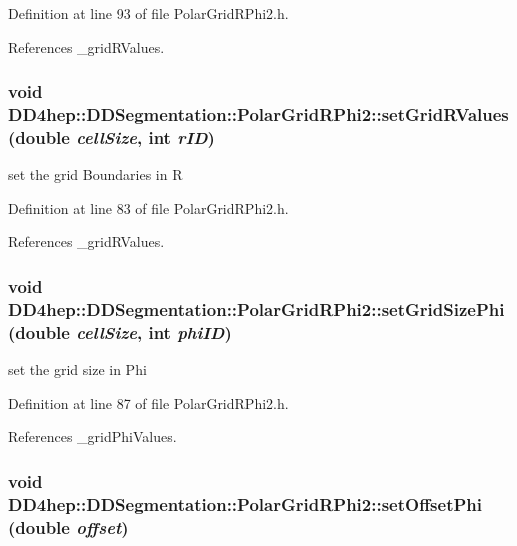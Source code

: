 Definition at line 93 of file PolarGridRPhi2.h.

References \_\-gridRValues.\hypertarget{class_d_d4hep_1_1_d_d_segmentation_1_1_polar_grid_r_phi2_a2194e846c26953f06cc74481d8aadeb4}{
\subsubsection[{setGridRValues}]{\setlength{\rightskip}{0pt plus 5cm}void DD4hep::DDSegmentation::PolarGridRPhi2::setGridRValues (double {\em cellSize}, \/  int {\em rID})}}
\label{class_d_d4hep_1_1_d_d_segmentation_1_1_polar_grid_r_phi2_a2194e846c26953f06cc74481d8aadeb4}


set the grid Boundaries in R 

Definition at line 83 of file PolarGridRPhi2.h.

References \_\-gridRValues.\hypertarget{class_d_d4hep_1_1_d_d_segmentation_1_1_polar_grid_r_phi2_a349f115397bac2c6c4891353bcfd88b0}{
\subsubsection[{setGridSizePhi}]{\setlength{\rightskip}{0pt plus 5cm}void DD4hep::DDSegmentation::PolarGridRPhi2::setGridSizePhi (double {\em cellSize}, \/  int {\em phiID})}}
\label{class_d_d4hep_1_1_d_d_segmentation_1_1_polar_grid_r_phi2_a349f115397bac2c6c4891353bcfd88b0}


set the grid size in Phi 

Definition at line 87 of file PolarGridRPhi2.h.

References \_\-gridPhiValues.\hypertarget{class_d_d4hep_1_1_d_d_segmentation_1_1_polar_grid_r_phi2_aa2807e9eae64b363d6a19cc605de5b81}{
\subsubsection[{setOffsetPhi}]{\setlength{\rightskip}{0pt plus 5cm}void DD4hep::DDSegmentation::PolarGridRPhi2::setOffsetPhi (double {\em offset})}}
\label{class_d_d4hep_1_1_d_d_segmentation_1_1_polar_grid_r_phi2_aa2807e9eae64b363d6a19cc605de5b81}


